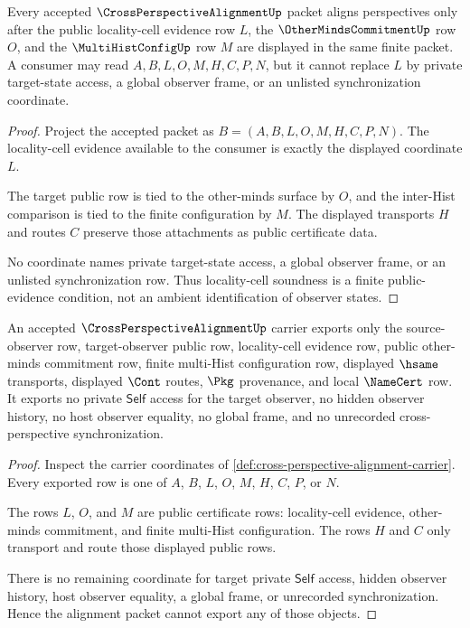 \begin{theorem}
\label{thm:cross-perspective-alignment-locality-cell-soundness}
Every accepted $\CrossPerspectiveAlignmentUp$ packet aligns perspectives only after the public locality-cell evidence row $L$, the $\OtherMindsCommitmentUp$ row $O$, and the $\MultiHistConfigUp$ row $M$ are displayed in the same finite packet. A consumer may read $A,B,L,O,M,H,C,P,N$, but it cannot replace $L$ by private target-state access, a global observer frame, or an unlisted synchronization coordinate.
\end{theorem}
\begin{proof}
Project the accepted packet as $B=(A,B,L,O,M,H,C,P,N)$. The locality-cell evidence available to the consumer is exactly the displayed coordinate $L$.

The target public row is tied to the other-minds surface by $O$, and the inter-Hist comparison is tied to the finite configuration by $M$. The displayed transports $H$ and routes $C$ preserve those attachments as public certificate data.

No coordinate names private target-state access, a global observer frame, or an unlisted synchronization row. Thus locality-cell soundness is a finite public-evidence condition, not an ambient identification of observer states.
\end{proof}

\begin{theorem}
\label{thm:cross-perspective-alignment-nonescape}
An accepted $\CrossPerspectiveAlignmentUp$ carrier exports only the source-observer row, target-observer public row, locality-cell evidence row, public other-minds commitment row, finite multi-Hist configuration row, displayed $\hsame$ transports, displayed $\Cont$ routes, $\Pkg$ provenance, and local $\NameCert$ row. It exports no private $\mathsf{Self}$ access for the target observer, no hidden observer history, no host observer equality, no global frame, and no unrecorded cross-perspective synchronization.
\end{theorem}
\begin{proof}
Inspect the carrier coordinates of \autoref{def:cross-perspective-alignment-carrier}. Every exported row is one of $A$, $B$, $L$, $O$, $M$, $H$, $C$, $P$, or $N$.

The rows $L$, $O$, and $M$ are public certificate rows: locality-cell evidence, other-minds commitment, and finite multi-Hist configuration. The rows $H$ and $C$ only transport and route those displayed public rows.

There is no remaining coordinate for target private $\mathsf{Self}$ access, hidden observer history, host observer equality, a global frame, or unrecorded synchronization. Hence the alignment packet cannot export any of those objects.
\end{proof}

